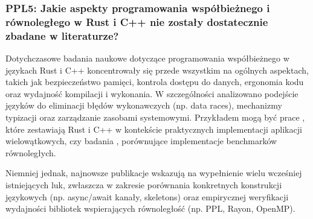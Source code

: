\subsubsection{PPL5: Jakie aspekty programowania współbieżnego i równoległego w Rust i C++ nie zostały dostatecznie zbadane w literaturze?}
Dotychczasowe badania naukowe dotyczące programowania współbieżnego w językach Rust i C++ koncentrowały się przede wszystkim na ogólnych aspektach, takich jak bezpieczeństwo pamięci, kontrola dostępu do danych, ergonomia kodu oraz wydajność kompilacji i wykonania. W szczególności analizowano podejście języków do eliminacji błędów wykonawczych (np. data races), mechanizmy typizacji oraz zarządzanie zasobami systemowymi. Przykładem mogą być prace \cite{heyman2020comparison}, które zestawiają Rust i C++ w kontekście praktycznych implementacji aplikacji wielowątkowych, czy badania \cite{martins2025npbrustnasparallelbenchmarks}, porównujące implementacje benchmarków równoległych.

Niemniej jednak, najnowsze publikacje wskazują na wypełnienie wielu wcześniej istniejących luk, zwłaszcza w zakresie porównania konkretnych konstrukcji językowych \linebreak (np. \mbox{async/await} kanały, skeletons) oraz empirycznej weryfikacji wydajności bibliotek wspierających równoległość (np. PPL, Rayon, OpenMP).


